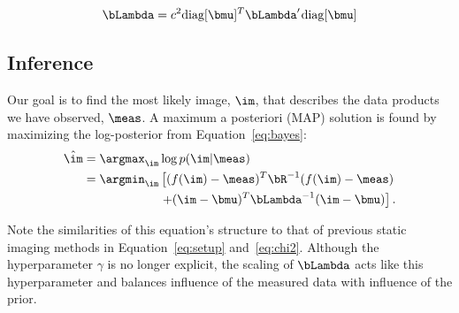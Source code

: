 \begin{align}
\bLambda = c^2 \mbox{diag}[\bmu ]^T \bLambda' \hspace{0.01in} \mbox{diag}[\bmu ] 
\end{align}



\subsection{Inference}
\label{sec:static_inf}


Our goal is to find the most likely image, $\im$, that describes the data products we have observed, $\meas$. A maximum a posteriori (MAP) solution is found by maximizing the log-posterior from Equation~\ref{eq:bayes}:
\begin{align}
\hat{\im}  = \argmax_{\im} & \log p(\im|\meas) \\
\notag =  \argmin_{\im}  &\left[ (f(\im)-\meas)^T \bR^{-1} (f(\im)-\meas) \right. \\
& \left. + (\im-\bmu)^T \bLambda^{-1} (\im-\bmu) \right] .
\end{align}

Note the similarities of this equation's structure to that of previous static imaging methods in Equation~\ref{eq:setup} and~\ref{eq:chi2}. 
Although the hyperparameter $\gamma$ is no longer explicit, the scaling of $\bLambda$ acts like this hyperparameter and balances influence of the measured data with influence of the prior.

